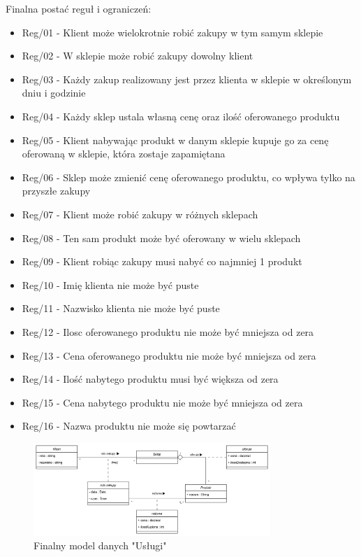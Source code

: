\documentclass[a4paper,12pt]{article}
\begin{document}
Finalna postać reguł i ograniczeń:

\begin{itemize}
    \item Reg/01 - Klient może wielokrotnie robić zakupy w tym samym sklepie
    \item Reg/02 - W sklepie może robić zakupy dowolny klient
    \item Reg/03 - Każdy zakup realizowany jest przez klienta w sklepie w określonym dniu i godzinie
    \item Reg/04 - Każdy sklep ustala własną cenę oraz ilość oferowanego produktu 
    \item Reg/05 - Klient nabywając produkt w danym sklepie kupuje go za cenę oferowaną w sklepie, która zostaje zapamiętana
    \item Reg/06 - Sklep może zmienić cenę oferowanego produktu, co wpływa tylko na przyszłe zakupy
    \item Reg/07 - Klient może robić zakupy w różnych sklepach
    \item Reg/08 - Ten sam produkt może być oferowany w wielu sklepach
    \item Reg/09 - Klient robiąc zakupy musi nabyć co najmniej 1 produkt
    \item Reg/10 - Imię klienta nie może być puste
    \item Reg/11 - Nazwisko klienta nie może być puste
    \item Reg/12 - Ilosc oferowanego produktu nie może być mniejsza od zera
    \item Reg/13 - Cena oferowanego produktu nie może być mniejsza od zera
    \item Reg/14 - Ilość nabytego produktu musi być większa od zera
    \item Reg/15 - Cena nabytego produktu nie może być mniejsza od zera
    \item Reg/16 - Nazwa produktu nie może się powtarzać
\end{itemize}

\begin{figure}[H]
\centering
\includegraphics[width=0.8\textwidth]{images/improved.png}
\caption{Finalny model danych "Usługi"}
\label{fig:final_model}
\end{figure}
\end{document}
